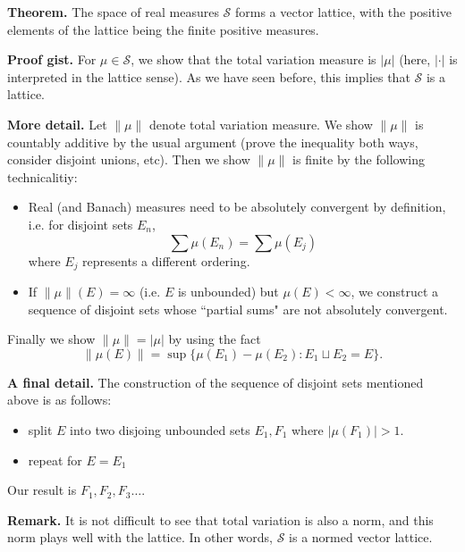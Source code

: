 \documentclass[12pt, letterpaper]{article}
\newcommand{\cS}{{\mathcal S}}
\renewcommand{\i}{\infty}
\begin{document}
\pagestyle{fancy}

\textbf{Theorem.} The space of real measures $\cS$ forms a vector lattice, with the positive elements of the lattice being the finite positive measures.

\textbf{Proof gist.} For $\mu \in \cS$, we show that the total variation measure is $|\mu|$ (here, $| \cdot |$ is interpreted in the lattice sense). As we have seen before, this implies that $\cS$ is a lattice.

\textbf{More detail.} Let $\|\mu\|$ denote total variation measure. We show $\|\mu\|$ is countably additive by the usual argument (prove the inequality both ways, consider disjoint unions, etc). Then we show $\|\mu\|$ is finite by the following technicalitiy:
\begin{itemize}
    \item Real (and Banach) measures need to be absolutely convergent by definition, i.e. for disjoint sets $E_n$,
        \[
            \sum \mu(E_n) = \sum \mu(E_j)
        \]
        where $E_j$ represents a different ordering.

    \item If $\|\mu\|(E) = \i$ (i.e. $E$ is unbounded) but $\mu(E) < \i$, we construct a sequence of disjoint sets whose ``partial sums" are not absolutely convergent.
\end{itemize}
Finally we show $\|\mu\| = |\mu|$ by using the fact
\[
    \|\mu(E)\| = \sup\{ \mu(E_1) - \mu(E_2): E_1 \sqcup E_2 = E\}.
\]

\textbf{A final detail.} The construction of the sequence of disjoint sets mentioned above is as follows:
\begin{itemize}
    \item split $E$ into two disjoing unbounded sets $E_1, F_1$ where $|\mu(F_1)| > 1$.
    \item repeat for $E = E_1$
\end{itemize}
Our result is $F_1, F_2, F_3 \dots$.

\textbf{Remark.} It is not difficult to see that total variation is also a norm, and this norm plays well with the lattice. In other words, $\cS$ is a normed vector lattice.
\end{document}
